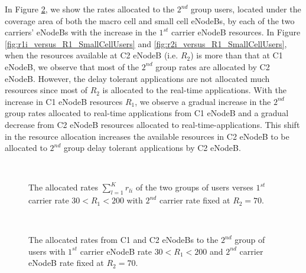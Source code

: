 \documentclass[journal]{IEEEtran} 		\usepackage{amsmath,amssymb}
\begin{document}
In Figure \ref{fig:ri_versus_R1_SmallCell}, we show the rates allocated to the $2^{nd}$ group users, located under the coverage area of both the macro cell and small cell eNodeBs, by each of the two carriers' eNodeBs with the increase in the $1^{st}$ carrier eNodeB resources. In Figure \ref{fig:r1i_versus_R1_SmallCellUsers} and \ref{fig:r2i_versus_R1_SmallCellUsers}, when the resources available at C2 eNodeB (i.e. $R_2$) is more than that at C1 eNodeB, we observe that most of the $2^{nd}$ group rates are allocated by C2 eNodeB. However, the delay tolerant applications are not allocated much resources since most of $R_2$ is allocated to the real-time applications. With the increase in C1 eNodeB resources $R_1$, we observe a gradual increase in the $2^{nd}$ group rates allocated to real-time applications from C1 eNodeB and a gradual decrease from C2 eNodeB resources allocated to real-time-applications. This shift in the resource allocation increases the available resources in C2 eNodeB to be allocated to $2^{nd}$ group delay tolerant applications by C2 eNodeB.
\begin{figure}[tb]
  \centering
  \\\caption{The allocated rates $\sum_{l=1}^{K}r_{li}$ of the two groups of users verses $1^{st}$ carrier rate $30<R_1<200$ with $2^{nd}$ carrier rate fixed at $R_2=70$.}
\label{fig:ri_versus_R1}
\end{figure}

\begin{figure}[tb]
  \centering
  \\\caption{The allocated rates from C1 and C2 eNodeBs to the $2^{nd}$ group of users with $1^{st}$ carrier eNodeB rate $30<R_1<200$ and $2^{nd}$ carrier eNodeB rate fixed at $R_2=70$.}
\label{fig:ri_versus_R1_SmallCell}
\end{figure}
\end{document}
